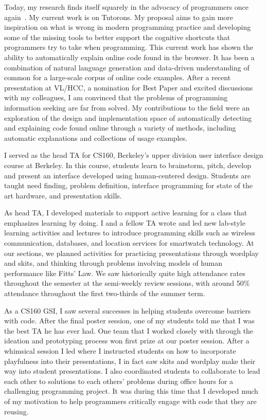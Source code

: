\documentclass[12pt]{memoir}
\begin{document}
Today, my research finds itself squarely in the advocacy of programmers once again~\cite{head_tutorons_2015}.
My current work is on Tutorons.
My proposal aims to gain more inspiration on what is wrong in modern programming practice and developing some of the missing tools to better support the cognitive shortcuts that programmers try to take when programming.
This current work has shown the ability to automatically explain online code found in the browser.
It has been a combination of natural language generation and data-driven understanding of common for a large-scale corpus of online code examples.
After a recent presentation at VL/HCC, a nomination for Best Paper and excited discussions with my colleagues, I am convinced that the problems of programming information seeking are far from solved.
My contributions to the field were an exploration of the design and implementation space of automatically detecting and explaining code found online through a variety of methods, including automatic explanations and collections of usage examples.


I served as the head TA for CS160, Berkeley's upper division user interface design course at Berkeley.
In this course, students learn to brainstorm, pitch, develop and present an interface developed using human-centered design.
Students are taught need finding, problem definition, interface programming for state of the art hardware, and presentation skills.

As head TA, I developed materials to support active learning for a class that emphasizes learning by doing.
I and a fellow TA wrote and led new lab-style learning activities and lectures to introduce programming skills such as wireless communication, databases, and location services for smartwatch technology.
At our sections, we planned activities for practicing presentations through wordplay and skits, and thinking through problems involving models of human performance like Fitts' Law.
We saw historically quite high attendance rates throughout the semester at the semi-weekly review sessions, with around 50\% attendance throughout the first two-thirds of the summer term.

As a CS160 GSI, I saw several successes in helping students overcome barriers with code.
After the final poster session, one of my students told me that I was the best TA he has ever had.
One team that I worked closely with through the ideation and prototyping process won first prize at our poster session.
After a whimsical session I led where I instructed students on how to incorporate playfulness into their presentations, I in fact saw skits and wordplay make their way into student presentations.
I also coordinated students to collaborate to lead each other to solutions to each others' problems during office hours for a challenging programming project.
It was during this time that I developed much of my motivation to help programmers critically engage with code that they are reusing.
\end{document}
